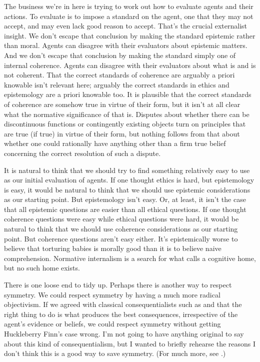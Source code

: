 The business we're in here is trying to work out how to evaluate agents and their actions. To evaluate is to impose a standard on the agent, one that they may not accept, and may even lack good reason to accept. That's the crucial externalist insight. We don't escape that conclusion by making the standard epistemic rather than moral. Agents can disagree with their evaluators about epistemic matters. And we don't escape that conclusion by making the standard simply one of internal coherence. Agents can disagree with their evaluators about what is and is not coherent. That the correct standards of coherence are arguably a priori knowable isn't relevant here; arguably the correct standards in ethics and epistemology are a priori knowable too. It is plausible that the correct standards of coherence are somehow true in virtue of their form, but it isn't at all clear what the normative significance of that is. Disputes about whether there can be discontinuous functions or contingently existing objects turn on principles that are true (if true) in virtue of their form, but nothing follows from that about whether one could rationally have anything other than a firm true belief concerning the correct resolution of such a dispute.

It is natural to think that we should try to find something relatively easy to use as our initial evaluation of agents. If one thought ethics is hard, but epistemology is easy, it would be natural to think that we should use epistemic considerations as our starting point. But epistemology isn't easy. Or, at least, it isn't the case that all epistemic questions are easier than all ethical questions. If one thought coherence questions were easy while ethical questions were hard, it would be natural to think that we should use coherence considerations as our starting point. But coherence questions aren't easy either. It's epistemically worse to believe that torturing babies is morally good than it is to believe naive comprehension. Normative internalism is a search for what \citet{Williamson2000} calls a cognitive home, but no such home exists.

There is one loose end to tidy up. Perhaps there is another way to respect symmetry. We could respect symmetry by having a much more radical objectivism. If we agreed with classical consequentialists such as \citet{Sidgwick1874} and \citet{Smart1961} that the right thing to do is what produces the best consequences, irrespective of the agent's evidence or beliefs, we could respect symmetry without getting \gls{Huck}leberry Finn's case wrong. I'm not going to have anything original to say about this kind of consequentialism, but I wanted to briefly rehearse the reasons I don't think this is a good way to save symmetry. (For much more, see \citet[Ch. 15]{Slote1992}.)

